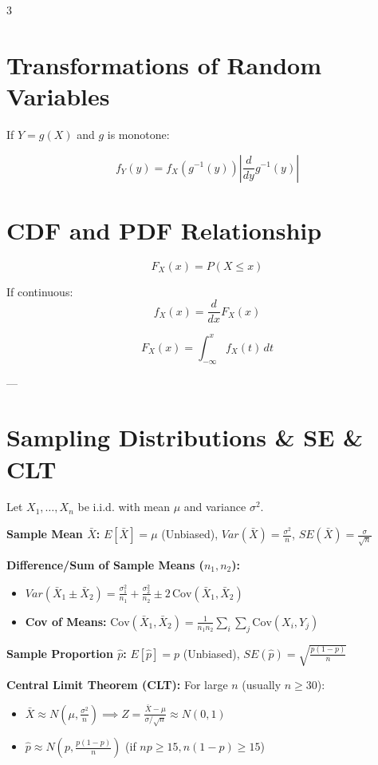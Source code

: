 \documentclass[10pt]{article}
\begin{document}
\begin{multicols}{3}
\section*{Transformations of Random Variables}

If $Y=g(X)$ and $g$ is monotone:

\[
f_Y(y)=f_X(g^{-1}(y))\left|\frac{d}{dy}g^{-1}(y)\right|
\]


\section*{CDF and PDF Relationship}

\[
F_X(x)=P(X\le x)
\]

If continuous:
\[
f_X(x)=\frac{d}{dx}F_X(x)
\]

\[
F_X(x)=\int_{-\infty}^{x} f_X(t)\,dt
\]

---

\section*{Sampling Distributions \& SE \& CLT}
Let $X_1,\dots,X_n$ be i.i.d. with mean $\mu$ and variance $\sigma^2$.

\textbf{Sample Mean $\bar X$:} $E[\bar X]=\mu$ (Unbiased), $Var(\bar X)=\frac{\sigma^2}{n}$, $SE(\bar X)=\frac{\sigma}{\sqrt n}$

\textbf{Difference/Sum of Sample Means ($n_1, n_2$):}
\begin{itemize}
    \item $Var(\bar{X}_1 \pm \bar{X}_2) = \frac{\sigma_1^2}{n_1} + \frac{\sigma_2^2}{n_2} \pm 2\,\text{Cov}(\bar{X}_1, \bar{X}_2)$
    \item \textbf{Cov of Means:} $\text{Cov}(\bar{X}_1, \bar{X}_2) = \frac{1}{n_1 n_2} \sum_{i} \sum_{j} \text{Cov}(X_i, Y_j)$
\end{itemize}

\textbf{Sample Proportion $\hat{p}$:} $E[\hat{p}]=p$ (Unbiased), $SE(\hat{p}) = \sqrt{\frac{p(1-p)}{n}}$

\textbf{Central Limit Theorem (CLT):}
For large $n$ (usually $n \ge 30$):
\begin{itemize}
    \item $\bar X \approx N\left(\mu, \frac{\sigma^2}{n}\right) \implies Z = \frac{\bar X-\mu}{\sigma/\sqrt n} \approx N(0,1)$
    \item $\hat{p} \approx N\left(p, \frac{p(1-p)}{n}\right)$ (if $np \ge 15, n(1-p) \ge 15$)
\end{itemize}


\end{multicols}
\end{document}
